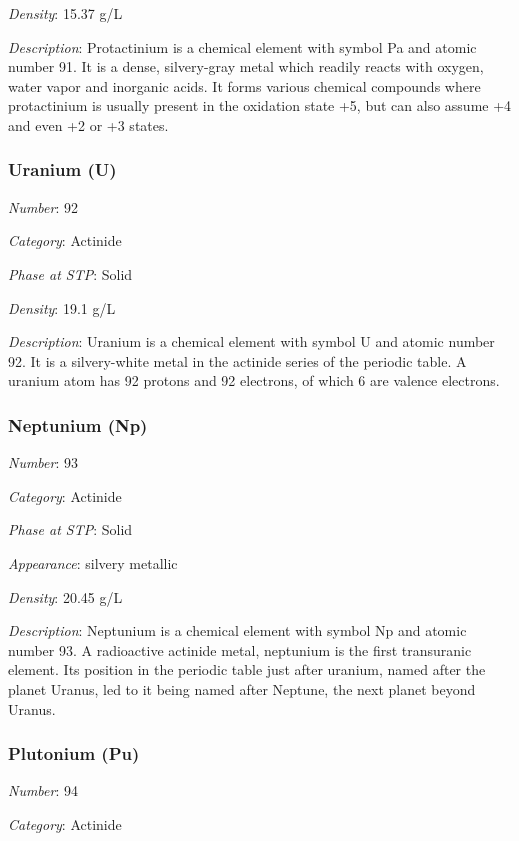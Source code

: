\documentclass{article}
\begin{document}
\textit{Density}: 15.37 g/L

\textit{Description}: Protactinium is a chemical element with symbol Pa and atomic number 91. It is a dense, silvery-gray metal which readily reacts with oxygen, water vapor and inorganic acids. It forms various chemical compounds where protactinium is usually present in the oxidation state +5, but can also assume +4 and even +2 or +3 states.

\hypertarget{subsubsection::U}{}\subsubsection{Uranium (U)}

\textit{Number}: 92

\textit{Category}: Actinide

\textit{Phase at STP}: Solid

\textit{Density}: 19.1 g/L

\textit{Description}: Uranium is a chemical element with symbol U and atomic number 92. It is a silvery-white metal in the actinide series of the periodic table. A uranium atom has 92 protons and 92 electrons, of which 6 are valence electrons.

\hypertarget{subsubsection::Np}{}\subsubsection{Neptunium (Np)}

\textit{Number}: 93

\textit{Category}: Actinide

\textit{Phase at STP}: Solid

\textit{Appearance}: silvery metallic

\textit{Density}: 20.45 g/L

\textit{Description}: Neptunium is a chemical element with symbol Np and atomic number 93. A radioactive actinide metal, neptunium is the first transuranic element. Its position in the periodic table just after uranium, named after the planet Uranus, led to it being named after Neptune, the next planet beyond Uranus.

\hypertarget{subsubsection::Pu}{}\subsubsection{Plutonium (Pu)}

\textit{Number}: 94

\textit{Category}: Actinide
\end{document}
